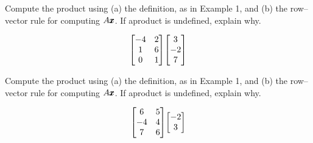 \documentclass{../mathhomework}
\newenvironment{Mat}{\begin{bmatrix}}{\end{bmatrix}}
\begin{document}
\maketitle

\pagebreak


\begin{problem}[1.4\#1]
    Compute the product using (a) the definition, as in Example 1, and (b) the row–vector rule for computing $A\pmb{x}$. If aproduct is undefined, explain why.

    \begin{equation*}
        \begin{Mat}
            -4 & 2 \\
            1 & 6 \\
            0 & 1
        \end{Mat}
        \begin{Mat}
            3 \\ -2 \\ 7
        \end{Mat}
    \end{equation*}
\end{problem}

\begin{problem}[1.4\#3]
    Compute the product using (a) the definition, as in Example 1, and (b) the row–vector rule for computing $A\pmb{x}$. If aproduct is undefined, explain why.

    \begin{equation*}
        \begin{Mat}
            6 & 5 \\
            -4 & 4 \\
            7 & 6
        \end{Mat}
        \begin{Mat}
            -2 \\ 3
        \end{Mat}
    \end{equation*}
\end{problem}
\end{document}
